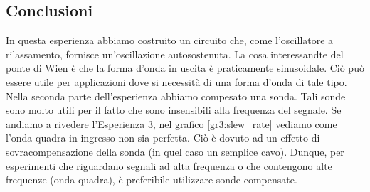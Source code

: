 \subsection*{Conclusioni}
In questa esperienza abbiamo costruito un circuito che, come l'oscillatore a rilassamento, fornisce un'oscillazione autosostenuta. La cosa interessandte del ponte di Wien è che la forma d'onda in uscita è praticamente sinusoidale. Ciò può essere utile per applicazioni dove si necessità di una forma d'onda di tale tipo. Nella seconda parte dell'esperienza abbiamo compesato una sonda. Tali sonde sono molto utili per il fatto che sono insensibili alla frequenza del segnale. Se andiamo a rivedere l'Esperienza 3, nel grafico \ref{gr3:slew_rate} vediamo come l'onda quadra in ingresso non sia perfetta. Ciò è dovuto ad un effetto di sovracompensazione della sonda (in quel caso un semplice cavo). Dunque, per esperimenti che riguardano segnali ad alta frequenza o che contengono alte frequenze (onda quadra), è preferibile utilizzare sonde compensate.
